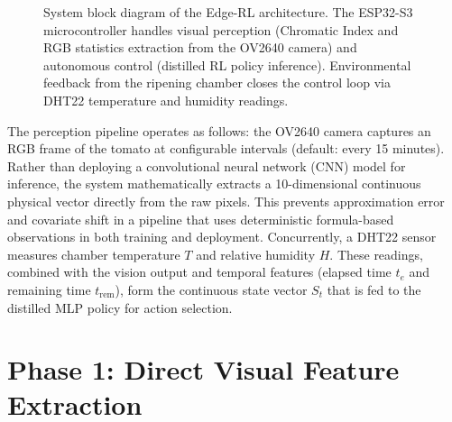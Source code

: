 \begin{figure}[ht]
        \caption{System block diagram of the Edge-RL architecture. The ESP32-S3 microcontroller handles visual perception (Chromatic Index and RGB statistics extraction from the OV2640 camera) and autonomous control (distilled RL policy inference). Environmental feedback from the ripening chamber closes the control loop via DHT22 temperature and humidity readings.}
        \label{fig:system_architecture}
    \end{figure}

    The perception pipeline operates as follows: the OV2640 camera captures an RGB frame of the tomato at configurable intervals (default: every 15 minutes). Rather than deploying a convolutional neural network (CNN) model for inference, the system mathematically extracts a 10-dimensional continuous physical vector directly from the raw pixels. This prevents approximation error and covariate shift in a pipeline that uses deterministic formula-based observations in both training and deployment. Concurrently, a DHT22 sensor measures chamber temperature $T$ and relative humidity $H$. These readings, combined with the vision output and temporal features (elapsed time $t_e$ and remaining time $t_{\text{rem}}$), form the continuous state vector $S_t$ that is fed to the distilled MLP policy for action selection.



\section{Phase 1: Direct Visual Feature Extraction}
    \label{sec:Vision Perception}

